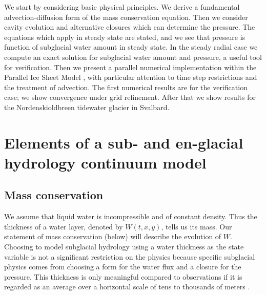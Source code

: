 \documentclass[11pt,final]{amsart}
\begin{document}
We start by considering basic physical principles.  We derive a fundamental advection-diffusion form of the mass conservation equation.  Then we consider cavity evolution and alternative closures which can determine the pressure.  The equations which apply in steady state are stated, and we see that pressure is function of subglacial water amount in steady state.  In the steady radial case we compute an exact solution for subglacial water amount and pressure, a useful tool for verification.  Then we present a parallel numerical implementation within the Parallel Ice Sheet Model \citep{pism-user-manual}, with particular attention to time step restrictions and the treatment of advection.  The first numerical results are for the verification case; we show convergence under grid refinement.  After that we show results for the Nordenskioldbreen tidewater glacier in Svalbard.


\section{Elements of a sub- and en-glacial hydrology continuum model}

\subsection*{Mass conservation}  We assume that liquid water is incompressible and of constant density.  Thus the thickness of a water layer, denoted by $W(t,x,y)$, tells us its mass.  Our statement of mass conservation (below) will describe the evolution of $W$.  Choosing to model subglacial hydrology using a water thickness as the state variable is not a significant restriction on the physics because specific subglacial physics comes from choosing a form for the water flux and a closure for the pressure.  This thickness is only meaningful compared to observations if it is regarded as an average over a horizontal scale of tens to thousands of meters \citep{FlowersClarke2002_theory}.
\end{document}
